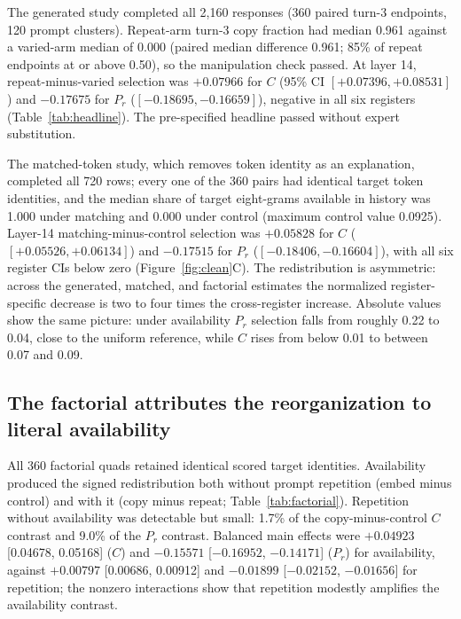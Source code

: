 \documentclass[10pt,a4paper,twocolumn]{article}
\begin{document}
The generated study completed all 2,160 responses (360 paired turn-3
endpoints, 120 prompt clusters). Repeat-arm turn-3 copy fraction had median
0.961 against a varied-arm median of 0.000 (paired median difference 0.961;
85\% of repeat endpoints at or above 0.50), so the manipulation check passed.
At layer 14, repeat-minus-varied selection was \(+0.07966\) for \(C\)
(95\% CI \([+0.07396,+0.08531]\)) and \(-0.17675\) for \(P_r\)
(\([-0.18695,-0.16659]\)), negative in all six registers
(Table~\ref{tab:headline}). The pre-specified headline passed without expert
substitution.

The matched-token study, which removes token identity as an explanation,
completed all 720 rows; every one of the 360 pairs had identical target token
identities, and the median share of target eight-grams available in history
was 1.000 under matching and 0.000 under control (maximum control value
0.0925). Layer-14 matching-minus-control selection was \(+0.05828\) for \(C\)
(\([+0.05526,+0.06134]\)) and \(-0.17515\) for \(P_r\)
(\([-0.18406,-0.16604]\)), with all six register CIs below zero
(Figure~\ref{fig:clean}C). The redistribution is asymmetric: across the
generated, matched, and factorial estimates the normalized register-specific
decrease is two to four times the cross-register increase. Absolute values
show the same picture: under availability \(P_r\) selection falls from roughly
0.22 to 0.04, close to the uniform reference, while \(C\) rises from below
0.01 to between 0.07 and 0.09.

\subsection{The factorial attributes the reorganization to literal availability}

All 360 factorial quads retained identical scored target identities.
Availability produced the signed redistribution both without prompt
repetition (embed minus control) and with it (copy minus repeat;
Table~\ref{tab:factorial}). Repetition without availability was detectable
but small: 1.7\% of the copy-minus-control \(C\) contrast and 9.0\% of the
\(P_r\) contrast. Balanced main effects were \(+0.04923\) [0.04678, 0.05168]
(\(C\)) and \(-0.15571\) [\(-0.16952\), \(-0.14171\)] (\(P_r\)) for
availability, against \(+0.00797\) [0.00686, 0.00912] and \(-0.01899\)
[\(-0.02152\), \(-0.01656\)] for repetition; the nonzero interactions show
that repetition modestly amplifies the availability contrast.
\end{document}
